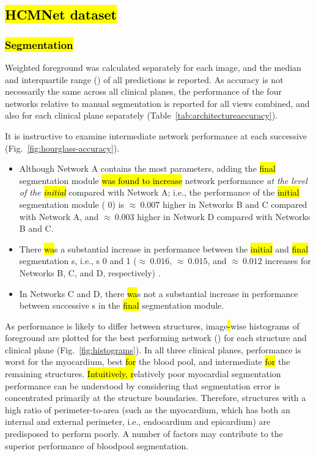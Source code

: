 \subsection{\hl{HCMNet dataset}}



\subsubsection{\hl{Segmentation}}

Weighted foreground \IoU{} was calculated separately for each image, and the median and interquartile range (\IQR{}) of all predictions is reported.
As accuracy is not necessarily the same across all clinical planes, the performance of the four networks relative to manual segmentation is reported for all views combined, and also for each clinical plane separately (Table~\ref{tab:architectureaccuracy}).



It is instructive to examine intermediate network performance at each successive \UNet{} (Fig.~\ref{fig:hourglass-accuracy}).

\begin{itemize}
\item Although Network A contains the most parameters, adding the \hl{final} segmentation module \hl{was found to increase} network performance \emph{at the level of the \hl{initial} \UNet{}} compared with Network A; 
i.e., the performance of the \hl{initial} segmentation module \UNet{} (\UNet{} $0$) is $\approx~0.007$ higher in Networks B and C compared with Network A, 
and $\approx~0.003$ higher in Network D compared with Networks B and C.
\item There \hl{wa}s a substantial increase in performance between the \hl{initial} and \hl{final} segmentation \UNet{}s, i.e., \UNet{}s 0 and 1 ($\approx~0.016$, $\approx~0.015$, and $\approx~0.012$ increases for Networks B, C, and D, respectively) .
\item In Networks C and D, there \hl{wa}s not a substantial increase in performance between successive \UNet{}s in the \hl{final} segmentation module.
\end{itemize}



As performance is likely to differ between structures, image\hl{-}wise histograms of foreground \IoU{} are plotted for the best performing network (\bestnetwork{}) for each structure and clinical plane (Fig.~\ref{fig:histograms}).
In all three clinical planes, performance is worst for the \LV{} myocardium, best \hl{for} the \LV{} blood pool, and intermediate \hl{for} the remaining structures.
\hl{Intuitively, r}elatively poor \LV{} myocardial segmentation performance can be understood by considering that segmentation error is concentrated primarily at the structure boundaries.
Therefore, structures with a high ratio of perimeter-to-area (such as the \LV{} myocardium, which has both an internal and external perimeter, i.e., endocardium and epicardium) are predisposed to perform poorly.
A number of factors may contribute to the superior performance of \LV{} bloodpool segmentation.

